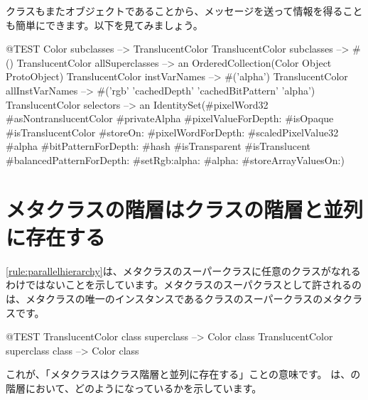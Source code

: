 \documentclass[a4paper,10pt,twoside]{book}
\begin{document}
クラスもまたオブジェクトであることから、メッセージを送って情報を得ることも簡単にできます。以下を見てみましょう。

\begin{code}{@TEST}
Color subclasses                           --> {TranslucentColor}
TranslucentColor subclasses         --> #()
TranslucentColor allSuperclasses  --> an OrderedCollection(Color Object ProtoObject)
TranslucentColor instVarNames     --> #('alpha')
TranslucentColor allInstVarNames --> #('rgb' 'cachedDepth' 'cachedBitPattern' 'alpha')
TranslucentColor selectors             -->  an IdentitySet(#pixelWord32 #asNontranslucentColor #privateAlpha #pixelValueForDepth: #isOpaque #isTranslucentColor #storeOn: #pixelWordForDepth: #scaledPixelValue32 #alpha #bitPatternForDepth: #hash #isTransparent #isTranslucent #balancedPatternForDepth: #setRgb:alpha: #alpha: #storeArrayValuesOn:)
\end{code}

\section{メタクラスの階層はクラスの階層と並列に存在する}

\ref{rule:parallelhierarchy}は、メタクラスのスーパークラスに任意のクラスがなれるわけではないことを示しています。メタクラスのスーパクラスとして許されるのは、メタクラスの唯一のインスタンスであるクラスのスーパークラスのメタクラスです。

\begin{code}{@TEST}
TranslucentColor class superclass --> Color class
TranslucentColor superclass class --> Color class
\end{code}

\noindent
これが、「メタクラスはクラス階層と並列に存在する」ことの意味です。 は、の階層において、どのようになっているかを示しています。
\end{document}
